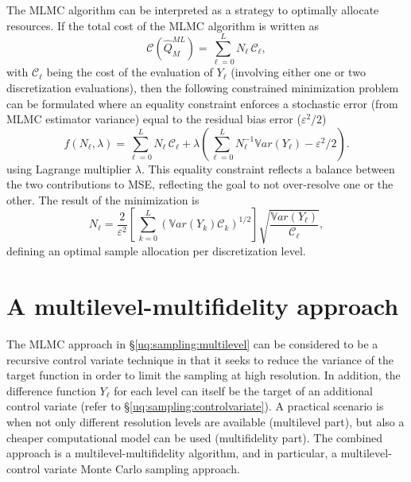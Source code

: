 The MLMC algorithm can be interpreted as a strategy to optimally allocate 
resources. If the total cost of the MLMC algorithm is written as  
\begin{equation}\label{EQ: MLMC cost}
\mathcal{C}(\hat{Q}^{ML}_{M}) = \sum_{\ell=0}^{L} N_\ell \, \mathcal{C}_{\ell},
\end{equation}
with $\mathcal{C}_{\ell}$ being the cost of the evaluation of $Y_\ell$ (involving either one or two discretization evaluations), then the following constrained minimization problem can be formulated where an equality constraint enforces a stochastic error (from MLMC estimator variance) equal to the residual bias error ($\varepsilon^2/2$)
\begin{equation}\label{EQ:mlmc_optimization}
 f(N_\ell,\lambda) = \sum_{\ell=0}^{L} N_\ell \, \mathcal{C}_{\ell} 
                   + \lambda \left( \sum_{\ell=0}^{L} N_\ell^{-1} \mathbb{V}ar\left({Y_\ell}\right) - \varepsilon^2/2 \right). 
\end{equation}
using Lagrange multiplier $\lambda$.  This equality constraint reflects a balance between the two contributions to MSE, reflecting the goal to not over-resolve one or the other.  The result of the minimization is
\begin{equation}\label{EQ: MLMC nl}
N_{\ell} = \frac{2}{\varepsilon^2} \left[ \, \sum_{k=0}^L \left( \mathbb{V}ar\left(Y_k\right) \mathcal{C}_k \right)^{1/2} \right] 
               \sqrt{\frac{ \mathbb{V}ar\left({Y_\ell}\right) }{\mathcal{C}_{\ell}}},
\end{equation}
defining an optimal sample allocation per discretization level.


\section{A multilevel-multifidelity approach} \label{uq:sampling:mlmf}

The MLMC approach in \S\ref{uq:sampling:multilevel} can be considered
to be a recursive control variate technique in that it seeks to reduce
the variance of the target function in order to limit the sampling at
high resolution. In addition, the difference function $Y_\ell$ for
each level can itself be the target of an additional control variate
(refer to \S\ref{uq:sampling:controlvariate}). A practical scenario is
when not only different resolution levels are available (multilevel
part), but also a cheaper computational model can be used
(multifidelity part). The combined approach is a
multilevel-multifidelity algorithm, and in particular, a
multilevel-control variate Monte Carlo sampling approach.

